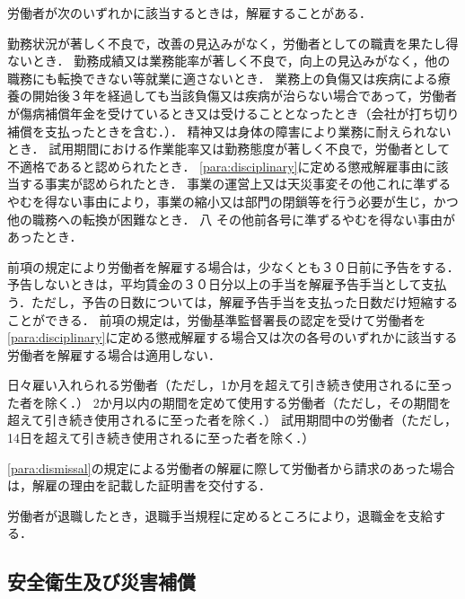 \documentclass[11pt,a4paper]{jsarticle}
\begin{document}
労働者が次のいずれかに該当するときは，解雇することがある．
\label{para:dismissal}
\begin{enumerate}
	\itm 勤務状況が著しく不良で，改善の見込みがなく，労働者としての職責を果たし得ないとき．
	\itm 勤務成績又は業務能率が著しく不良で，向上の見込みがなく，他の職務にも転換できない等就業に適さないとき．
	\itm 業務上の負傷又は疾病による療養の開始後３年を経過しても当該負傷又は疾病が治らない場合であって，労働者が傷病補償年金を受けているとき又は受けることとなったとき（会社が打ち切り補償を支払ったときを含む．）．
	\itm 精神又は身体の障害により業務に耐えられないとき．
	\itm 試用期間における作業能率又は勤務態度が著しく不良で，労働者として不適格であると認められたとき．
	\itm \ref{para:disciplinary}に定める懲戒解雇事由に該当する事実が認められたとき．
	\itm 事業の運営上又は天災事変その他これに準ずるやむを得ない事由により，事業の縮小又は部門の閉鎖等を行う必要が生じ，かつ他の職務への転換が困難なとき．
	\itm 八	その他前各号に準ずるやむを得ない事由があったとき．
\end{enumerate}
\term
前項の規定により労働者を解雇する場合は，少なくとも３０日前に予告をする．予告しないときは，平均賃金の３０日分以上の手当を解雇予告手当として支払う．ただし，予告の日数については，解雇予告手当を支払った日数だけ短縮することができる．
\term
前項の規定は，労働基準監督署長の認定を受けて労働者を\ref{para:disciplinary}に定める懲戒解雇する場合又は次の各号のいずれかに該当する労働者を解雇する場合は適用しない．
\begin{enumerate}
	\itm 日々雇い入れられる労働者（ただし，1か月を超えて引き続き使用されるに至った者を除く．）
	\itm 2か月以内の期間を定めて使用する労働者（ただし，その期間を超えて引き続き使用されるに至った者を除く．）
	\itm 試用期間中の労働者（ただし，14日を超えて引き続き使用されるに至った者を除く．）
\end{enumerate}
\term
\ref{para:dismissal}の規定による労働者の解雇に際して労働者から請求のあった場合は，解雇の理由を記載した証明書を交付する．

労働者が退職したとき，退職手当規程に定めるところにより，退職金を支給する．
\label{para:severance}

\subsection{安全衛生及び災害補償}
\end{document}

